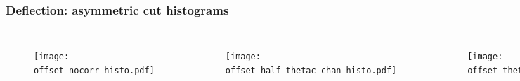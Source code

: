 \documentclass[10pt]{beamer}
\begin{document}
\begin{frame}
\frametitle{Deflection: asymmetric cut histograms}

\begin{columns}[c] %

\begin{figure}
\texttt{[image: offset\_nocorr\_histo.pdf]}\\
\end{figure}%

\begin{figure}
\texttt{[image: offset\_half\_thetac\_chan\_histo.pdf]}\\
\end{figure}%
\vspace{-0.5cm}%
\begin{figure}
\texttt{[image: offset\_thetac\_chan\_histo.pdf]}\\
\end{figure}



\end{columns}
\end{frame}











\end{document}
